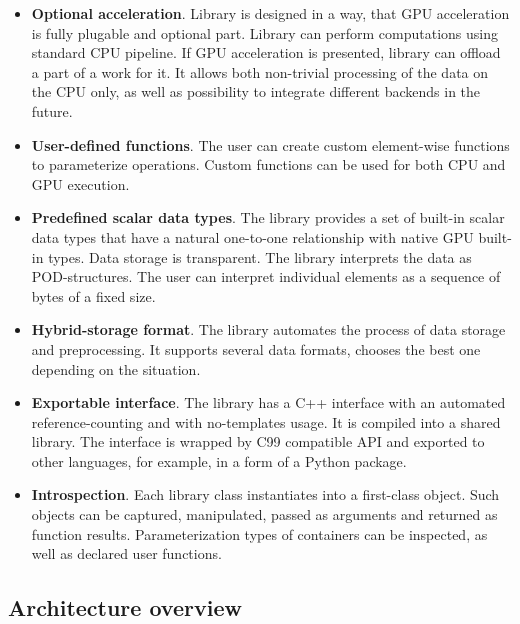 \begin{itemize}

    \item \textbf{Optional acceleration}. Library is designed in a way, that GPU acceleration is fully plugable and optional part. Library can perform computations using standard CPU pipeline. If GPU acceleration is presented, library can offload a part of a work for it. It allows both non-trivial processing of the data on the CPU only, as well as possibility to integrate different backends in the future.  
    
    \item \textbf{User-defined functions}. The user can create custom element-wise functions to parameterize operations. Custom functions can be used for both CPU and GPU execution.
    
    \item \textbf{Predefined scalar data types}. The library provides a set of built-in scalar data types that have a natural one-to-one relationship with native GPU built-in types. Data storage is transparent. The library interprets the data as POD-structures. The user can interpret individual elements as a sequence of bytes of a fixed size.
    
    \item \textbf{Hybrid-storage format}. The library automates the process of data storage and preprocessing. It supports several data formats, chooses the best one depending on the situation.
    
    \item \textbf{Exportable interface}. The library has a C++ interface with an automated reference-counting and with no-templates usage. It is compiled into a shared library. The interface is wrapped by C99 compatible API and exported to other languages, for example, in a form of a Python package.
    
    \item \textbf{Introspection}. Each library class instantiates into a first-class object. Such objects can be captured, manipulated, passed as arguments and returned as function results. Parameterization types of containers can be inspected, as well as declared user functions.

\end{itemize}

\subsection{Architecture overview}

